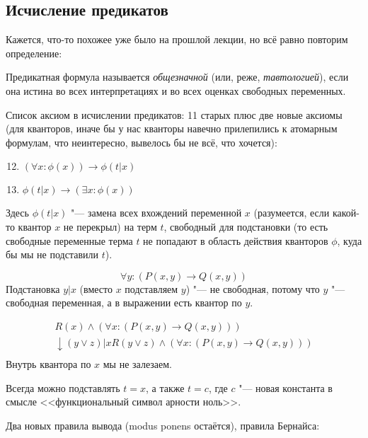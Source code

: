 \subsection{Исчисление предикатов}
Кажется, что-то похожее уже было на прошлой лекции, но всё равно повторим определение:
\begin{Def}
	Предикатная формула называется \textsl{общезначной} (или, реже, \textsl{тавтологией}),
	если она истина во всех интерпретациях и во всех оценках свободных переменных.
\end{Def}
Список аксиом в исчислении предикатов: 11 старых плюс две новые аксиомы
(для кванторов, иначе бы у нас кванторы навечно прилепились к атомарным формулам, что неинтересно,
вывелось бы не всё, что хочется):
\begin{enumerate}
	\setcounter{enumi}{11}
	\item $(\forall x \colon \phi(x)) \to \phi(t|x)$
	\item $\phi(t|x) \to (\exists x \colon \phi(x))$
\end{enumerate}
Здесь $\phi(t|x)$ "--- замена всех вхождений переменной $x$ (разумеется, если какой-то квантор $x$ не перекрыл)
на терм $t$, свободный для подстановки (то есть свободные переменные терма $t$ не попадают в область действия кванторов $\phi$,
куда бы мы не подставили $t$).
\begin{exmp}
	\[ \forall y \colon (P(x, y) \to Q(x, y)) \]
	Подстановка $y|x$ (вместо $x$ подставляем $y$) "--- не свободная, потому что $y$ "--- свободная переменная, а в выражении есть
	квантор по $y$.
\end{exmp}
\begin{exmp}
	\begin{gather*}
		R(x) \land (\forall x \colon (P(x, y) \to Q(x, y))) \\
		\downarrow (y\lor z)|x
		R(y \lor z) \land (\forall x \colon (P(x, y) \to Q(x, y))) \\
	\end{gather*}
	Внутрь квантора по $x$ мы не залезаем.
\end{exmp}
\begin{exmp}
	Всегда можно подставлять $t=x$, а также $t=c$, где $c$ "--- новая константа в смысле <<функциональный символ арности ноль>>.
\end{exmp}
Два новых правила вывода (modus ponens остаётся), правила Бернайса:

